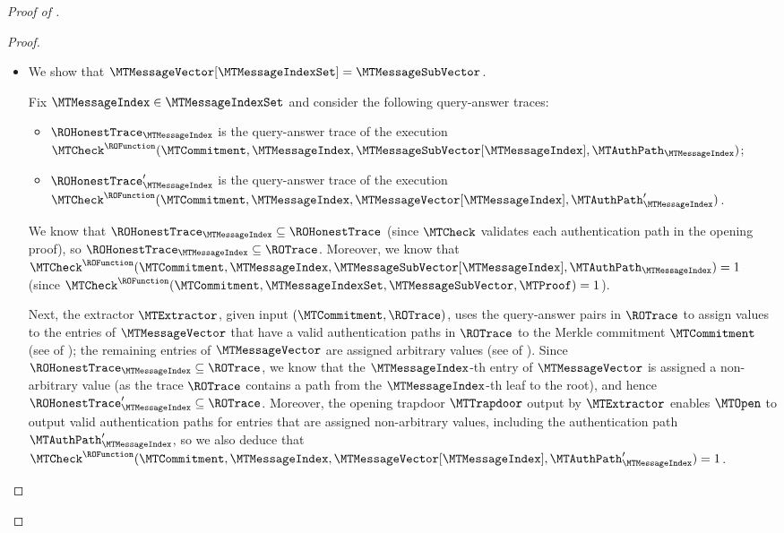 \begin{proof}[Proof of ]
\begin{enumerate}
\begin{proof}
\begin{itemize}
  \item We show that $\MTMessageVector[\MTMessageIndexSet] = \MTMessageSubVector$.

Fix $\MTMessageIndex \in \MTMessageIndexSet$ and consider the following query-answer traces:
\begin{itemize}[nolistsep]
  \item $\ROHonestTrace_{\MTMessageIndex}$ is the query-answer trace of the execution $\MTCheck^{\ROFunction}(\MTCommitment,\MTMessageIndex,\MTMessageSubVector[\MTMessageIndex],\MTAuthPath_{\MTMessageIndex})$;
  \item $\ROHonestTrace'_{\MTMessageIndex}$ is the query-answer trace of the execution $\MTCheck^{\ROFunction}(\MTCommitment,\MTMessageIndex,\MTMessageVector[\MTMessageIndex],\MTAuthPath'_{\MTMessageIndex})$.
\end{itemize}

We know that $\ROHonestTrace_{\MTMessageIndex} \subseteq \ROHonestTrace$ (since $\MTCheck$ validates each authentication path in the opening proof), so $\ROHonestTrace_{\MTMessageIndex} \subseteq \ROTrace$. Moreover, we know that  $\MTCheck^{\ROFunction}(\MTCommitment,\MTMessageIndex,\MTMessageSubVector[\MTMessageIndex],\MTAuthPath_{\MTMessageIndex})=1$ (since $\MTCheck^{\ROFunction}(\MTCommitment,\MTMessageIndexSet,\MTMessageSubVector,\MTProof)=1$).

Next, the extractor $\MTExtractor$, given input $(\MTCommitment,\ROTrace)$, uses the query-answer pairs in $\ROTrace$ to assign values to the entries of $\MTMessageVector$ that have a valid authentication paths in $\ROTrace$ to the Merkle commitment $\MTCommitment$ (see  of ); the remaining entries of $\MTMessageVector$ are assigned arbitrary values (see  of ). Since $\ROHonestTrace_{\MTMessageIndex} \subseteq \ROTrace$, we know that the $\MTMessageIndex$-th entry of $\MTMessageVector$ is assigned a non-arbitrary value (as the trace $\ROTrace$ contains a path from the $\MTMessageIndex$-th leaf to the root), and hence $\ROHonestTrace'_{\MTMessageIndex} \subseteq \ROTrace$. Moreover, the opening trapdoor $\MTTrapdoor$ output by $\MTExtractor$ enables $\MTOpen$ to output valid authentication paths for entries that are assigned non-arbitrary values, including the authentication path $\MTAuthPath'_{\MTMessageIndex}$, so we also deduce that $\MTCheck^{\ROFunction}(\MTCommitment,\MTMessageIndex,\MTMessageVector[\MTMessageIndex],\MTAuthPath'_{\MTMessageIndex})=1$.


\end{itemize}
\end{proof}
\end{enumerate}
\end{proof}
